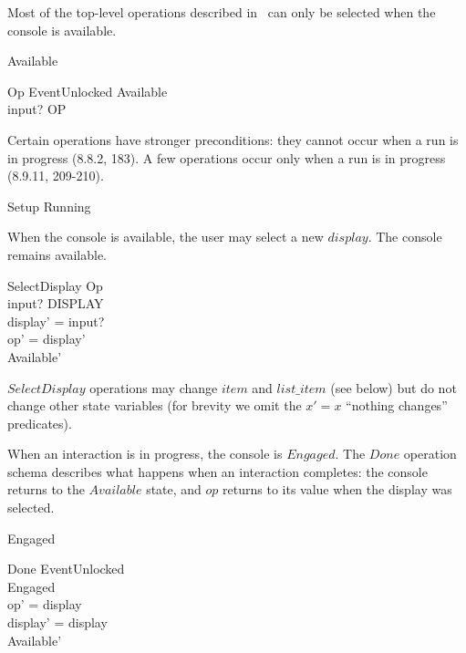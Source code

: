 Most of the top-level operations described in~\cite{jacky92}
can only be selected when the console is available.

\begin{zed} Available  \end{zed}

\begin{schema}{Op}
	EventUnlocked
\where
	Available \\
	input? \in OP \\
\end{schema}
Certain operations have stronger preconditions: they cannot occur when
a run is in progress (8.8.2, 183).  A few operations occur only when a
run is in progress (8.9.11, 209-210). 

\begin{zed}
	Setup 
\also
	Running 
\end{zed}
When the console is available, the user may select a new $display$.
The console remains available.

\begin{schema}{SelectDisplay}
	Op \\
\where
	input? \in DISPLAY \\
	display' = input?  \\
	op' = display' \\
	Available' \\
\end{schema}
$SelectDisplay$ operations may change $item$ and $list\_item$ (see
below) but do not change other state variables (for brevity we omit
the $x' = x$ ``nothing changes'' predicates).

When an interaction is in progress, the console is $Engaged$.
The $Done$ operation schema describes what happens when an interaction
completes: the console returns to the $Available$ state, and $op$
returns to its value when the display was selected.

\begin{zed} Engaged  \end{zed}

\begin{schema}{Done}
	EventUnlocked \\
\where
	Engaged \\
	op' = display \\
	display' = display \\
	Available'
\end{schema}

